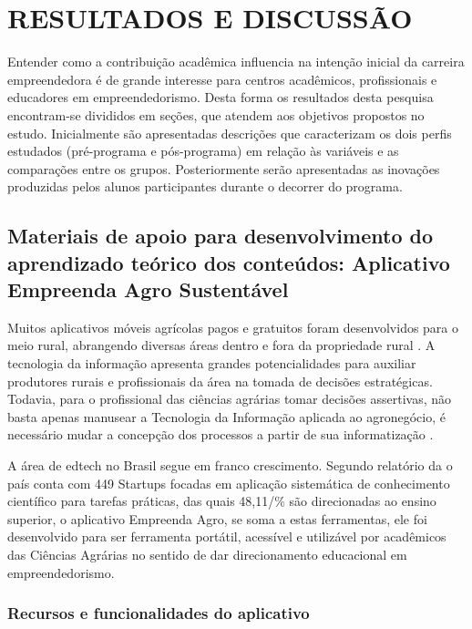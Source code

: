 \chapter{RESULTADOS E DISCUSSÃO}

Entender como a contribuição acadêmica influencia na intenção inicial da carreira empreendedora é de grande interesse para centros acadêmicos, profissionais e educadores em empreendedorismo. Desta forma os resultados desta pesquisa encontram-se divididos em seções, que atendem aos objetivos propostos no estudo.
Inicialmente são apresentadas descrições que caracterizam os dois perfis estudados
(pré-programa e pós-programa) em relação às variáveis e as comparações entre os grupos. Posteriormente serão apresentadas as inovações produzidas pelos alunos participantes durante o decorrer do programa.



\section{Materiais de apoio para desenvolvimento do aprendizado teórico dos conteúdos: Aplicativo Empreenda Agro Sustentável}



Muitos aplicativos móveis agrícolas pagos e gratuitos foram desenvolvidos para o meio rural, abrangendo diversas áreas dentro e fora da propriedade rural \cite{silva_environment_2015}. A tecnologia da informação apresenta grandes potencialidades para auxiliar produtores rurais e profissionais da área na tomada de decisões estratégicas. Todavia, para o profissional das ciências agrárias tomar decisões assertivas, não basta apenas manusear a Tecnologia da Informação aplicada ao agronegócio, é   necessário   mudar   a   concepção   dos   processos   a   partir   de   sua informatização \cite{ferraz_tecnologia_2017}.

A área de edtech no Brasil segue em franco crescimento. Segundo relatório da  o país conta com 449 Startups focadas em aplicação sistemática de conhecimento científico para tarefas práticas, das quais 48,11/\% são direcionadas ao ensino superior, o aplicativo Empreenda Agro, se soma a estas ferramentas, ele foi desenvolvido para ser ferramenta portátil, acessível e utilizável por acadêmicos das Ciências Agrárias no sentido de dar direcionamento educacional em empreendedorismo. 


\subsection{Recursos e funcionalidades do aplicativo}

